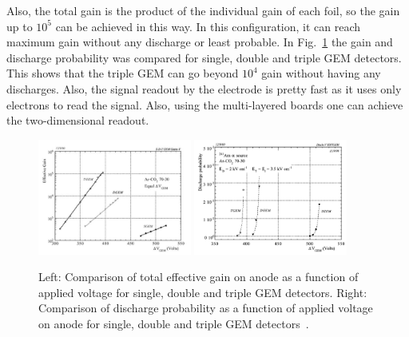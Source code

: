 Also, the total gain is the product of the individual gain of each foil, so the gain up to $10^5$ can be achieved in this way.
In this configuration, it can reach maximum gain without any discharge or least probable.
In Fig.~\ref{fig:tripleGEM_discharge_gain} the gain and discharge probability was compared for single, double and triple GEM detectors. This shows that the triple GEM can go beyond $10^4$ gain without having any discharges.
Also, the signal readout by the electrode is pretty fast as it uses only electrons to read the signal. 
Also, using the multi-layered boards one can achieve the two-dimensional readout.
\begin{figure}[!htbp]
    \centering
    \includegraphics[width=0.45\textwidth]{figures/GEM/Comp_threeGEMS_Gain.png}%
    \includegraphics[width=0.45\textwidth]{figures/GEM/Comp_threeGEMS_DischargeProbability.png}
    \caption{Left: Comparison of total effective gain on anode as a function of applied voltage for single, double and triple GEM detectors. Right: Comparison of discharge probability as a function of applied voltage on anode for single, double and triple GEM detectors~\cite{Bachmann2002}.}
    \label{fig:tripleGEM_discharge_gain}
\end{figure}


